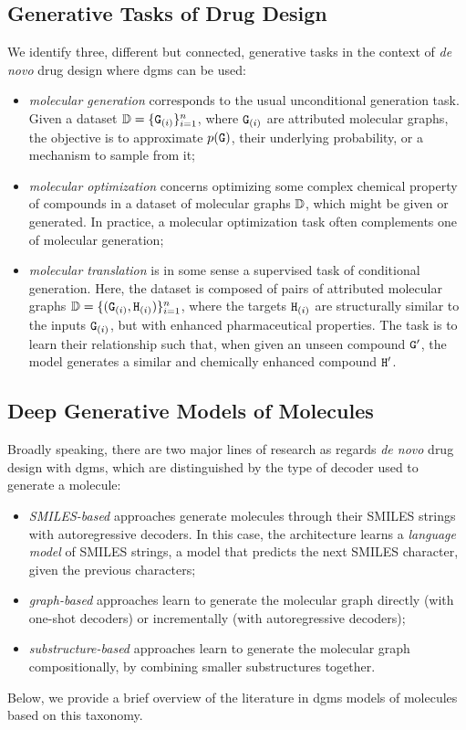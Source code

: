 \subsection{Generative Tasks of Drug Design}
We identify three, different but connected, generative tasks in the context of \emph{de novo} drug design where \glspl{dgm} can be used:
\begin{itemize}
    \item \emph{molecular generation} corresponds to the usual unconditional generation task. Given a dataset $\Data = \{\PatternGraph{g}{i}\}_{i=1}^n$, where $\PatternGraph{g}{i}$ are attributed molecular graphs, the objective is to approximate $p(\mathtt{G})$, their underlying probability, or a mechanism to sample from it;
    \item \emph{molecular optimization} concerns optimizing some complex chemical property of compounds in a dataset of molecular graphs $\mathbb{D}$, which might be given or generated. In practice, a molecular optimization task often complements one of molecular generation;
    \item \emph{molecular translation} is in some sense a supervised task of conditional generation. Here, the dataset is composed of pairs of attributed molecular graphs $\Data = \{(\PatternGraph{g}{i}, \PatternGraph{h}{i})\}_{i=1}^n$, where the targets $\PatternGraph{h}{i}$ are structurally similar to the inputs $\PatternGraph{g}{i}$, but with enhanced pharmaceutical properties. The task is to learn their relationship such that, when given an unseen compound $\mathtt{G'}$, the model generates a similar and chemically enhanced compound $\mathtt{H'}$.
\end{itemize}

\subsection{Deep Generative Models of Molecules} \label{sec:review}
Broadly speaking, there are two major lines of research as regards \emph{de novo} drug design with \glspl{dgm}, which are distinguished by the type of decoder used to generate a molecule:
\begin{itemize}
    \item \emph{SMILES-based} approaches generate molecules through their SMILES strings with autoregressive decoders. In this case, the architecture learns a \emph{language model} of SMILES strings, \ie a model that predicts the next SMILES character, given the previous characters;
    \item \emph{graph-based} approaches learn to generate the molecular graph directly (with one-shot decoders) or incrementally (with autoregressive decoders);
    \item \emph{substructure-based} approaches learn to generate the molecular graph compositionally, by combining smaller substructures together.
\end{itemize}
Below, we provide a brief overview of the literature in \glspl{dgm} models of molecules based on this taxonomy.

